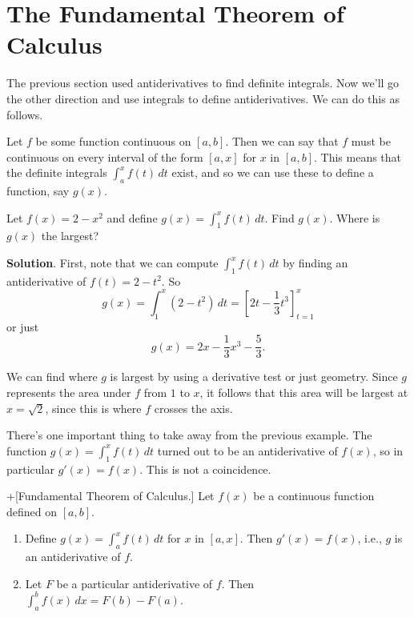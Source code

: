 \documentclass[10pt,]{book}
\theoremstyle{ptxplainnotitle}
\theoremstyle{ptxplaintitle}
\theoremstyle{ptxplainnotitle}
\theoremstyle{ptxplaintitle}
\theoremstyle{ptxplainnotitle}
\theoremstyle{ptxplaintitle}
\theoremstyle{ptxdefinitionnotitle}
\theoremstyle{ptxdefinitiontitle}
\theoremstyle{ptxdefinitionnotitle}
\theoremstyle{ptxdefinitiontitle}
\theoremstyle{ptxdefinitionnotitle}
\theoremstyle{ptxdefinitiontitle}
\theoremstyle{ptxdefinitionnotitle}
\theoremstyle{ptxdefinitiontitle}
\theoremstyle{ptxdefinitionnotitle}
\theoremstyle{ptxdefinitiontitle}
\numberwithin{equation}{section}
\begin{document}
\section[{The Fundamental Theorem of Calculus}]{The Fundamental Theorem of Calculus}\label{section-the-fundamental-theorem-of-calculus}
\hypertarget{p-460}{}%
The previous section used antiderivatives to find definite integrals. Now we'll go the other direction and use integrals to define antiderivatives. We can do this as follows.%
\par
\hypertarget{p-461}{}%
Let \(f\) be some function continuous on \([a,b]\). Then we can say that \(f\) must be continuous on every interval of the form \([a,x]\) for \(x\) in \([a,b]\). This means that the definite integrals \(\int_{a}^{x}f(t)\,dt\) exist, and so we can use these to define a function, say \(g(x)\).%
\begin{example}\label{example-functions-from-integrals}
\hypertarget{p-462}{}%
Let \(f(x) = 2 - x^{2}\) and define \(g(x) = \int_{1}^{x}f(t)\,dt\). Find \(g(x)\). Where is \(g(x)\) the largest?%
\par\smallskip%
\noindent\textbf{Solution}.\hypertarget{solution-101}{}\quad%
\hypertarget{p-463}{}%
First, note that we can compute \(\int_{1}^{x}f(t)\,dt\) by finding an antiderivative of \(f(t) = 2 - t^{2}\). So%
\begin{equation*}
g(x) = \int_{1}^{x}(2-t^{2})\,dt = \left[2t-\frac{1}{3}t^{3}\right]_{t=1}^{x}
\end{equation*}
or just%
\begin{equation*}
g(x) = 2x - \frac{1}{3}x^{3} - \frac{5}{3}.
\end{equation*}
%
\par
\hypertarget{p-464}{}%
We can find where \(g\) is largest by using a derivative test or just geometry. Since \(g\) represents the area under \(f\) from \(1\) to \(x\), it follows that this area will be largest at \(x=\sqrt{2}\), since this is where \(f\) crosses the axis.%
\end{example}
\hypertarget{p-465}{}%
There's one important thing to take away from the previous example. The function \(g(x) = \int_{1}^{x}f(t)\,dt\) turned out to be an antiderivative of \(f(x)\), so in particular \(g'(x) = f(x)\). This is not a coincidence.%
\begin{theorem}+[{Fundamental Theorem of Calculus.}]\label{theorem-fundamental-theorem-of-calculus}
\hypertarget{p-466}{}%
Let \(f(x)\) be a continuous function defined on \([a,b]\).%
\leavevmode%
\begin{enumerate}
\item\hypertarget{li-40}{}Define \(g(x) = \int_{a}^{x}f(t)\,dt\) for \(x\) in \([a,x]\). Then \(g'(x) = f(x)\), i.e., \(g\) is an antiderivative of \(f\).%
\item\hypertarget{li-41}{}Let \(F\) be a particular antiderivative of \(f\). Then \(\int_{a}^{b}f(x)\,dx = F(b) - F(a).\)%
\end{enumerate}
\end{theorem}
\end{document}
